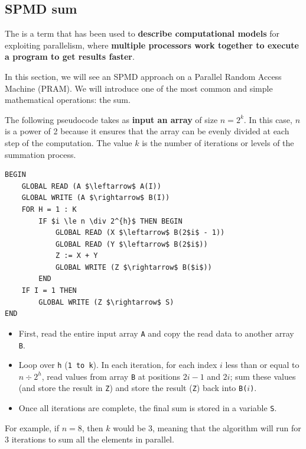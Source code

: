 \subsection{SPMD sum}

The  is a term that has been used to \textbf{describe computational models} for exploiting parallelism, where \textbf{multiple processors work together to execute a program to get results faster}.

\highspace
In this section, we will see an SPMD approach on a Parallel Random Access Machine (PRAM). We will introduce one of the most common and simple mathematical operations: the sum.

\highspace
The following pseudocode takes as \textbf{input an array} of size $n = 2^{k}$. In this case, $n$ is a power of 2 because it ensures that the array can be evenly divided at each step of the computation. The value $k$ is the number of iterations or levels of the summation process.
\begin{lstlisting}[mathescape=true, caption={Single Program Multiple Data (SPMD) sum}]
BEGIN
    GLOBAL READ (A $\leftarrow$ A(I))
    GLOBAL WRITE (A $\rightarrow$ B(I))
    FOR H = 1 : K
        IF $i \le n \div 2^{h}$ THEN BEGIN
            GLOBAL READ (X $\leftarrow$ B(2$i$ - 1))
            GLOBAL READ (Y $\leftarrow$ B(2$i$))
            Z := X + Y
            GLOBAL WRITE (Z $\rightarrow$ B($i$))
        END
    IF I = 1 THEN
        GLOBAL WRITE (Z $\rightarrow$ S)
END
\end{lstlisting}
\begin{itemize}
    \item First, read the entire input array \texttt{A} and copy the read data to another array \texttt{B}.
    
    \item Loop over \texttt{h} (\texttt{1 to k}). In each iteration, for each index $i$ less than or equal to $n \div 2^{h}$, read values from array \texttt{B} at positions $2i-1$ and $2i$; sum these values (and store the result in \texttt{Z}) and store the result (\texttt{Z}) back into \texttt{B($i$)}.
    
    \item Once all iterations are complete, the final sum is stored in a variable \texttt{S}.
\end{itemize}
For example, if $n = 8$, then $k$ would be 3, meaning that the algorithm will run for 3 iterations to sum all the elements in parallel.
